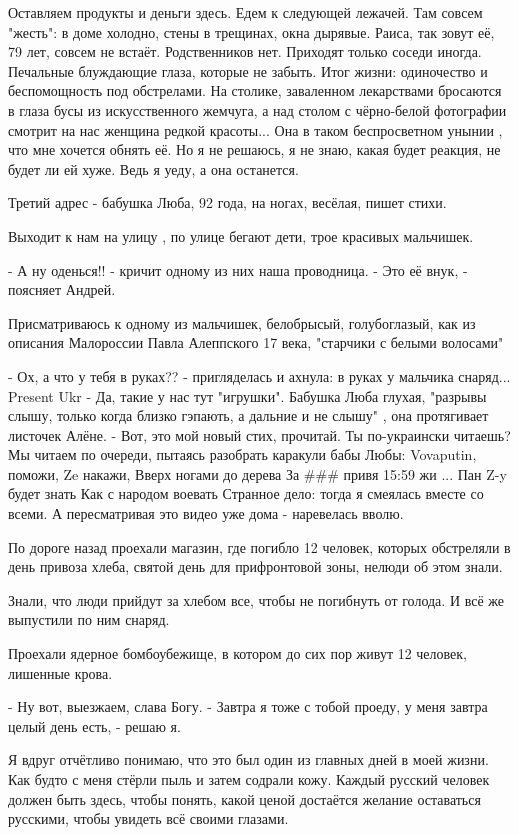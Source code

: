 Оставляем продукты и деньги здесь. Едем к следующей лежачей. Там совсем
"жесть": в доме холодно, стены в трещинах, окна дырявые. Раиса, так зовут её,
79 лет, совсем не встаёт. Родственников нет. Приходят только соседи иногда.
Печальные блуждающие глаза, которые не забыть. Итог жизни: одиночество и
беспомощность под обстрелами. На столике, заваленном лекарствами бросаются в
глаза бусы из искусственного жемчуга, а над столом с чёрно-белой фотографии
смотрит на нас женщина редкой красоты... Она в таком беспросветном унынии , что
мне хочется обнять её. Но я не решаюсь, я не знаю, какая будет реакция, не
будет ли ей хуже. Ведь я уеду, а она останется.

Третий адрес - бабушка Люба, 92 года, на ногах, весёлая, пишет стихи.

Выходит к нам на улицу , по улице бегают дети, трое красивых мальчишек.

- А ну оденься!! - кричит одному из них наша проводница.
- Это её внук, - поясняет Андрей.

Присматриваюсь к одному из мальчишек, белобрысый, голубоглазый, как из описания
Малороссии Павла Алеппского 17 века, "старчики с белыми волосами"

- Ох, а что у тебя в руках?? - пригляделась и ахнула: в руках у мальчика снаряд... Present Ukr
- Да, такие у нас тут "игрушки".
Бабушка Люба глухая, "разрывы слышу, только когда близко гэпають, а дальние и не слышу" , она протягивает листочек Алёне.
- Вот, это мой новый стих, прочитай. Ты по-украински читаешь?
Мы читаем по очереди, пытаясь разобрать каракули бабы Любы:
Vovaputin, поможи,
Ze накажи,
Вверх ногами до дерева
За \#\#\# привя
15:59
жи
...
Пан Z-y будет знать
Как с народом воевать
Странное дело: тогда я смеялась вместе со всеми. А пересматривая это видео уже дома - наревелась вволю.

По дороге назад проехали магазин, где погибло 12 человек, которых обстреляли в
день привоза хлеба, святой день для прифронтовой зоны, нелюди об этом знали.

Знали, что люди прийдут за хлебом все, чтобы не погибнуть от голода. И всё же
выпустили по ним снаряд.

Проехали ядерное бомбоубежище, в котором до сих пор живут 12 человек, лишенные крова.

- Ну вот, выезжаем, слава Богу.
- Завтра я тоже с тобой проеду, у меня завтра целый день есть, - решаю я.

Я вдруг отчётливо понимаю, что это был один из главных дней в моей жизни. Как
будто с меня стёрли пыль и затем содрали кожу. Каждый русский человек должен
быть здесь, чтобы понять, какой ценой достаётся желание оставаться русскими,
чтобы увидеть всё своими глазами.
